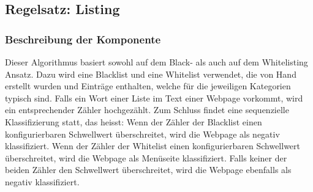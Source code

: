 \subsection{Regelsatz: Listing}
\subsubsection{Beschreibung der Komponente}
Dieser Algorithmus basiert sowohl auf dem Black- als auch auf dem Whitelisting Ansatz.
Dazu wird eine Blacklist und eine Whitelist verwendet, die von Hand erstellt wurden und Einträge enthalten, welche für die jeweiligen Kategorien typisch sind.
Falls ein Wort einer Liste im Text einer Webpage vorkommt, wird ein entsprechender Zähler hochgezählt.
Zum Schluss findet eine sequenzielle Klassifizierung statt, das heisst: 
Wenn der Zähler der Blacklist einen konfigurierbaren Schwellwert überschreitet, wird die Webpage als negativ klassifiziert. 
Wenn der Zähler der Whitelist einen konfigurierbaren Schwellwert überschreitet, wird die Webpage als Menüseite klassifiziert.
Falls keiner der beiden Zähler den Schwellwert überschreitet, wird die Webpage ebenfalls als negativ klassifiziert. 
